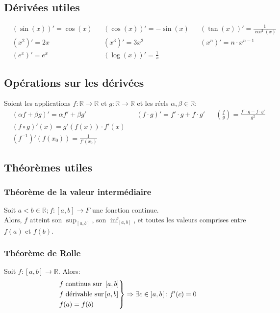 \documentclass{article}
\numberwithin{equation}{subsection}
\begin{document}
\subsection{Dérivées utiles}
\begin{align*}
	&(\sin(x))' = \cos(x)
		& &(\cos(x))' = -\sin(x)
			& &(\tan(x))' = \frac{1}{\cos^2(x)} \\
	&(x^2)' = 2x
		& &(x^3)' = 3x^2
			& &(x^n)' = n \cdot x^{n-1} \\
	&(e^x)' = e^x
		& &(\log(x))' = \frac{1}{x}
\end{align*}

\subsection{Opérations sur les dérivées}
Soient les applications \(f: \mathbb{R} \to \mathbb{R}\) et \(g: \mathbb{R} \to \mathbb{R}\) et les réels \(\alpha, \beta \in \mathbb{R}\):
\begin{align*}
	&(\alpha f + \beta g)' = \alpha f' + \beta g' 
		& &(f \cdot g)' = f' \cdot g + f \cdot g' 
			& &\left (\frac{f}{g}\right ) = \frac{f' \cdot g - f \cdot g'}{g^2} \\ 
	&(f \circ g)'(x) = g'(f(x)) \cdot f'(x) \\
	&(f^{-1})' (f(x_0))  = \frac{1}{f'(x_0)} %
\end{align*}

\subsection{Théorèmes utiles} %

\subsubsection{Théorème de la valeur intermédiaire}
Soit \(a < b \in \mathbb{R}; f : \left [a, b \right ] \to F\) une fonction continue. \\
Alors, \(f\) atteint son \(\sup_{\left [a, b \right ]}\), son \(\inf_{\left [a, b \right ]}\), et toutes les valeurs comprises entre \(f(a)\) et \(f(b)\).

\subsubsection{Théorème de Rolle}
Soit \(f : \left [a, b \right ] \to \mathbb{R}\). Alors:
\begin{equation*}
	\begin{rcases}
		f \text{ continue sur } \left [a, b \right ] \\
		f \text{ dérivable sur} \left [a, b \right ] \\
		f(a) = f(b)
	\end{rcases}
	\Rightarrow \exists c \in \left ]a, b \right [ : f'(c) = 0
\end{equation*}
\end{document}
